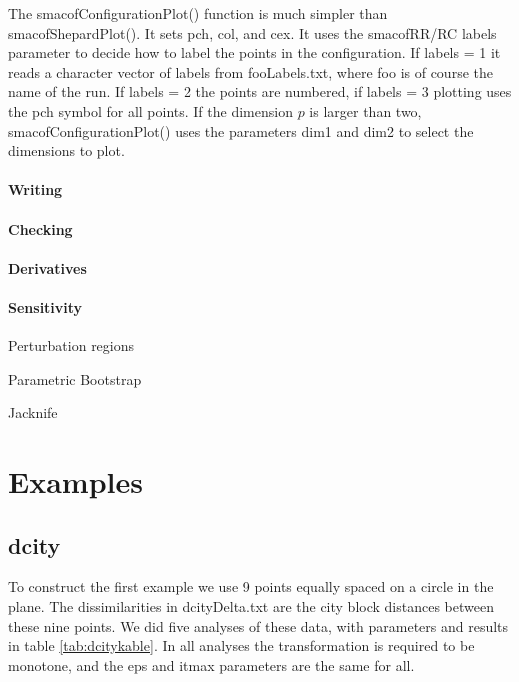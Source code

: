 \documentclass[
  12pt,
]{article}
\begin{document}
The smacofConfigurationPlot() function is much simpler than
smacofShepardPlot(). It sets pch, col, and cex. It uses
the smacofRR/RC labels parameter to decide how to label
the points in the configuration. If labels = 1 it reads
a character vector of labels from fooLabels.txt, where
foo is of course the name of the run. If labels = 2
the points are numbered, if labels = 3 plotting uses
the pch symbol for all points. If the dimension \(p\)
is larger than two, smacofConfigurationPlot() uses
the parameters dim1 and dim2 to select the dimensions
to plot.

\paragraph{Writing}\label{writing}

\paragraph{Checking}\label{checking}

\paragraph{Derivatives}\label{derivatives-1}

\paragraph{Sensitivity}\label{sensitivity}

Perturbation regions

Parametric Bootstrap

Jacknife

\section{Examples}\label{examples}

\subsection{dcity}\label{dcity}

To construct the first example we use 9 points equally spaced on a
circle in the plane. The dissimilarities in dcityDelta.txt are the city
block distances between these nine points. We did five analyses of these data, with parameters and results in table \ref{tab:dcitykable}. In all analyses the transformation is required to be monotone, and the eps and itmax parameters are the same for all.
\end{document}
